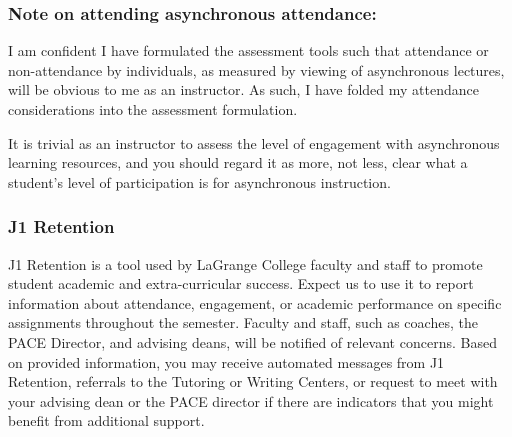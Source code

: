\documentclass[11pt]{article}
\begin{document}
\subsubsection*{Note on attending asynchronous attendance:}

I am confident I have formulated the assessment tools such that attendance or non-attendance by individuals, as measured by viewing of asynchronous lectures, will be obvious to me as an instructor. As such, I have folded my attendance considerations into the assessment formulation.

It is trivial as an instructor to assess the level of engagement with asynchronous learning resources, and you should regard it as more, not less, clear what a student's level of participation is for asynchronous instruction.

\subsubsection*{J1 Retention}

J1 Retention is a tool used by LaGrange College faculty and staff to promote student academic and extra-curricular success. Expect us to use it to report information about attendance, engagement, or academic performance on specific assignments throughout the semester. Faculty and staff, such as coaches, the PACE Director, and advising deans, will be notified of relevant concerns. Based on provided information, you may receive automated messages from J1 Retention, referrals to the Tutoring or Writing Centers, or request to meet with your advising dean or the PACE director if there are indicators that you might benefit from additional support. 
\end{document}
